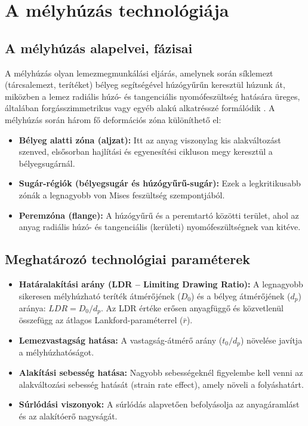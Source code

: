 \documentclass[12pt,a4paper,oneside]{report}
\begin{document}
\section{A mélyhúzás technológiája}
\subsection{A mélyhúzás alapelvei, fázisai}
A mélyhúzás olyan lemezmegmunkálási eljárás, amelynek során síklemezt (tárcsalemezt, terítéket) bélyeg segítségével húzógyűrűn keresztül húzunk át, miközben a lemez radiális húzó- és tangenciális nyomófeszültség hatására üreges, általában forgásszimmetrikus vagy egyéb alakú alkatrésszé formálódik \cite{Gillemot1977, Weltsch2019}.
A mélyhúzás során három fő deformációs zóna különíthető el:
\begin{itemize}
    \item \textbf{Bélyeg alatti zóna (aljzat):} Itt az anyag viszonylag kis alakváltozást szenved, elsősorban hajlítási és egyenesítési cikluson megy keresztül a bélyegsugárnál.
    \item \textbf{Sugár-régiók (bélyegsugár és húzógyűrű-sugár):} Ezek a legkritikusabb zónák a legnagyobb von Mises feszültség szempontjából.
    \item \textbf{Peremzóna (flange):} A húzógyűrű és a peremtartó közötti terület, ahol az anyag radiális húzó- és tangenciális (kerületi) nyomófeszültségnek van kitéve.
\end{itemize}

\subsection{Meghatározó technológiai paraméterek}
\begin{itemize}
    \item \textbf{Határalakítási arány (LDR – Limiting Drawing Ratio):} A legnagyobb sikeresen mélyhúzható teríték átmérőjének ($D_0$) és a bélyeg átmérőjének ($d_p$) aránya: $LDR = D_0 / d_p$. Az LDR értéke erősen anyagfüggő és közvetlenül összefügg az átlagos Lankford-paraméterrel ($\bar{r}$).
    \item \textbf{Lemezvastagság hatása:} A vastagság-átmérő arány ($t_0/d_p$) növelése javítja a mélyhúzhatóságot.
    \item \textbf{Alakítási sebesség hatása:} Nagyobb sebességeknél figyelembe kell venni az alakváltozási sebesség hatását (strain rate effect), amely növeli a folyáshatárt.
    \item \textbf{Súrlódási viszonyok:} A súrlódás alapvetően befolyásolja az anyagáramlást és az alakítóerő nagyságát.
\end{itemize}
\end{document}
